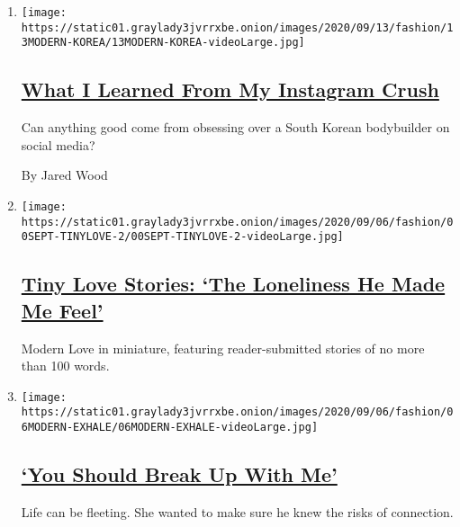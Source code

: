 \begin{enumerate}
\def\labelenumi{\arabic{enumi}.}
\item
  \texttt{[image: https://static01.graylady3jvrrxbe.onion/images/2020/09/13/fashion/13MODERN-KOREA/13MODERN-KOREA-videoLarge.jpg]}

  \hypertarget{what-i-learned-from-my-instagram-crush}{%
  \subsection{\texorpdfstring{\href{/2020/09/11/style/modern-love-no-emoticon-for-this-emotion.html}{What
  I Learned From My Instagram
  Crush}}{What I Learned From My Instagram Crush}}\label{what-i-learned-from-my-instagram-crush}}

  Can anything good come from obsessing over a South Korean bodybuilder
  on social media?

  By Jared Wood
\item
  \texttt{[image: https://static01.graylady3jvrrxbe.onion/images/2020/09/06/fashion/00SEPT-TINYLOVE-2/00SEPT-TINYLOVE-2-videoLarge.jpg]}

  \hypertarget{tiny-love-stories-the-loneliness-he-made-me-feel}{%
  \subsection{\texorpdfstring{\href{/2020/09/08/style/tiny-modern-love-stories-the-loneliness-he-made-me-feel.html}{Tiny
  Love Stories: `The Loneliness He Made Me
  Feel'}}{Tiny Love Stories: `The Loneliness He Made Me Feel'}}\label{tiny-love-stories-the-loneliness-he-made-me-feel}}

  Modern Love in miniature, featuring reader-submitted stories of no
  more than 100 words.
\item
  \texttt{[image: https://static01.graylady3jvrrxbe.onion/images/2020/09/06/fashion/06MODERN-EXHALE/06MODERN-EXHALE-videoLarge.jpg]}

  \hypertarget{you-should-break-up-with-me}{%
  \subsection{\texorpdfstring{\href{/2020/09/04/style/modern-love-widow-cancer-break-up-with-me.html}{`You
  Should Break Up With
  Me'}}{`You Should Break Up With Me'}}\label{you-should-break-up-with-me}}

  Life can be fleeting. She wanted to make sure he knew the risks of
  connection.


\end{enumerate}
